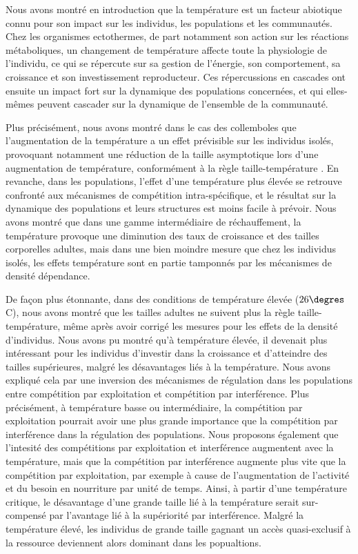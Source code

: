 Nous avons montré en introduction que la température est un facteur abiotique
connu pour son impact sur les individus, les populations et les communautés.
Chez les organismes ectothermes, de part notamment son action sur les réactions
métaboliques, un changement de température affecte toute
la physiologie de l'individu, ce qui se répercute sur sa gestion de l'énergie,
son comportement, sa croissance et son investissement reproducteur. Ces
répercussions en cascades ont ensuite un impact fort sur la dynamique des
populations concernées, et qui elles-mêmes peuvent cascader sur la dynamique de
l'ensemble de la communauté. 

Plus précisément, nous avons montré dans le cas des collemboles que
l'augmentation de la température a un effet prévisible sur les individus isolés,
provoquant notamment une réduction de la taille asymptotique lors d'une
augmentation de température, conformément à la règle taille-température
\autocites{angilletta2009a}. En revanche, dans les populations, l'effet d'une
température plus élevée se retrouve confronté aux mécanismes de compétition
intra-spécifique, et le résultat sur la dynamique des populations et leurs
structures est moins facile à prévoir. Nous avons montré que dans une gamme
intermédiaire de réchauffement, la température provoque une diminution des taux
de croissance et des tailles corporelles adultes, mais dans une bien moindre
mesure que chez les individus isolés, les effets température sont en partie
tamponnés par les mécanismes de densité dépendance. 

De façon plus étonnante, dans des conditions de température élevée
($26\degres$C), nous avons montré que les tailles adultes ne suivent plus la
règle taille-température, même après avoir corrigé les mesures pour les effets
de la densité d'individus. Nous avons pu montré qu'à température élevée, il
devenait plus intéressant pour les individus d'investir dans la croissance et
d'atteindre des tailles supérieures, malgré les désavantages liés à la
température. Nous avons expliqué cela par une inversion des mécanismes de
régulation dans les populations entre compétition par exploitation et
compétition par interférence. Plus précisément, à température basse ou
intermédiaire, la compétition par exploitation pourrait avoir une plus grande
importance que la compétition par interférence dans la régulation des
populations. Nous proposons également que l'intesité des compétitions par
exploitation et interférence augmentent avec la température, mais que la
compétition par interférence augmente plus vite que la compétition par
exploitation, par exemple à cause de l'augmentation de l'activité et du besoin
en nourriture par unité de temps.
Ainsi, à partir d'une température critique, le désavantage d'une grande taille
lié à la température serait sur-compensé par l'avantage lié à la supériorité par
interférence. Malgré la température élevé, les individus de grande taille
gagnant un accès quasi-exclusif à la ressource deviennent alors dominant dans
les popualtions. 

